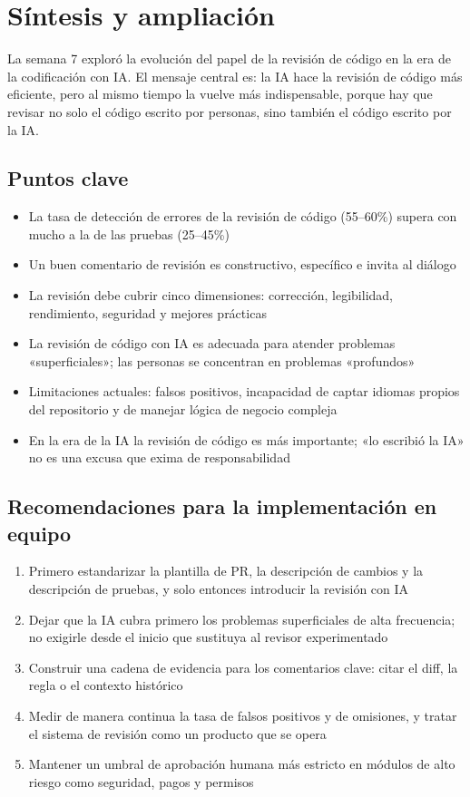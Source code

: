 \section{Síntesis y ampliación}

La semana 7 exploró la evolución del papel de la revisión de código en la era de la codificación con IA. El mensaje central es: la IA hace la revisión de código más eficiente, pero al mismo tiempo la vuelve más indispensable, porque hay que revisar no solo el código escrito por personas, sino también el código escrito por la IA.

\subsection{Puntos clave}

\begin{itemize}
    \item La tasa de detección de errores de la revisión de código (55--60\%) supera con mucho a la de las pruebas (25--45\%)
    \item Un buen comentario de revisión es constructivo, específico e invita al diálogo
    \item La revisión debe cubrir cinco dimensiones: corrección, legibilidad, rendimiento, seguridad y mejores prácticas
    \item La revisión de código con IA es adecuada para atender problemas «superficiales»; las personas se concentran en problemas «profundos»
    \item Limitaciones actuales: falsos positivos, incapacidad de captar idiomas propios del repositorio y de manejar lógica de negocio compleja
    \item En la era de la IA la revisión de código es más importante; «lo escribió la IA» no es una excusa que exima de responsabilidad
\end{itemize}

\subsection{Recomendaciones para la implementación en equipo}

\begin{enumerate}
    \item Primero estandarizar la plantilla de PR, la descripción de cambios y la descripción de pruebas, y solo entonces introducir la revisión con IA
    \item Dejar que la IA cubra primero los problemas superficiales de alta frecuencia; no exigirle desde el inicio que sustituya al revisor experimentado
    \item Construir una cadena de evidencia para los comentarios clave: citar el diff, la regla o el contexto histórico
    \item Medir de manera continua la tasa de falsos positivos y de omisiones, y tratar el sistema de revisión como un producto que se opera
    \item Mantener un umbral de aprobación humana más estricto en módulos de alto riesgo como seguridad, pagos y permisos
\end{enumerate}

